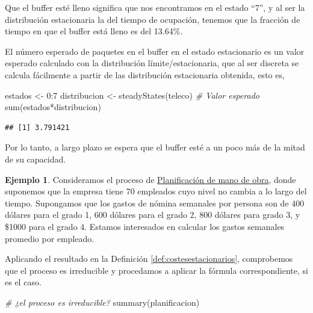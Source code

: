 \documentclass[
]{book}
\newenvironment{Shaded}{\begin{snugshade}}{\end{snugshade}}
\newcommand{\CommentTok}[1]{\textcolor[rgb]{0.56,0.35,0.01}{\textit{#1}}}
\newcommand{\DecValTok}[1]{\textcolor[rgb]{0.00,0.00,0.81}{#1}}
\newcommand{\FunctionTok}[1]{\textcolor[rgb]{0.00,0.00,0.00}{#1}}
\newcommand{\NormalTok}[1]{#1}
\newcommand{\OtherTok}[1]{\textcolor[rgb]{0.56,0.35,0.01}{#1}}
\newcommand{\SpecialCharTok}[1]{\textcolor[rgb]{0.00,0.00,0.00}{#1}}
\theoremstyle{definition}
\theoremstyle{definition}
\newtheorem{example}{Ejemplo}[chapter]
\theoremstyle{definition}
\theoremstyle{definition}
\theoremstyle{remark}
\begin{document}
Que el buffer esté lleno significa que nos encontramos en el estado ``7'', y al ser la distribución estacionaria la del tiempo de ocupación, tenemos que la fracción de tiempo en que el buffer está lleno es del 13.64\%.

El número esperado de paquetes en el buffer en el estado estacionario es un valor esperado calculado con la distribución límite/estacionaria, que al ser discreta se calcula fácilmente a partir de las distribución estacionaria obtenida, esto es,

\begin{Shaded}
\begin{Highlighting}[]
\NormalTok{estados }\OtherTok{\textless{}{-}} \DecValTok{0}\SpecialCharTok{:}\DecValTok{7}
\NormalTok{distribucion }\OtherTok{\textless{}{-}} \FunctionTok{steadyStates}\NormalTok{(teleco)}
\CommentTok{\# Valor esperado}
\FunctionTok{sum}\NormalTok{(estados}\SpecialCharTok{*}\NormalTok{distribucion)}
\end{Highlighting}
\end{Shaded}

\begin{verbatim}
## [1] 3.791421
\end{verbatim}

Por lo tanto, a largo plazo se espera que el buffer esté a un poco más de la mitad de su capacidad.

\begin{example}
Consideramos el proceso de \protect\hyperlink{planificacion}{Planificación de mano de obra}, donde suponemos que la empresa tiene 70 empleados cuyo nivel no cambia a lo largo del tiempo. Supongamos que los gastos de nómina semanales por persona son de 400 dólares para el grado 1, 600 dólares para el grado 2, 800 dólares para grado 3, y \$1000 para el grado 4. Estamos interesados en calcular los gastos semanales promedio por empleado.
\end{example}

Aplicando el resultado en la Definición \ref{def:costesestacionarios}, comprobemos que el proceso es irreducible y procedamos a aplicar la fórmula correspondiente, si es el caso.

\begin{Shaded}
\begin{Highlighting}[]
\CommentTok{\# ¿el proceso es irreducible?}
\FunctionTok{summary}\NormalTok{(planificacion)}
\end{Highlighting}
\end{Shaded}
\end{document}
